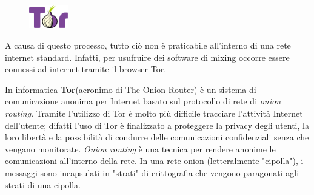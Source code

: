 \begin{figure}
	\vspace{-20pt}
	\includegraphics[width=0.15\textwidth]{figure/torlogo}
\end{figure}
A causa di questo processo, tutto ciò non è praticabile all'interno di una rete internet standard. Infatti, per usufruire dei software di mixing occorre essere connessi ad internet tramite il browser Tor.

In informatica \textbf{Tor}(acronimo di The Onion Router) è un sistema di comunicazione anonima per Internet basato sul protocollo di rete di \textit{onion routing}. Tramite l'utilizzo di Tor è molto più difficile tracciare l'attività Internet dell'utente; difatti l'uso di Tor è finalizzato a proteggere la privacy degli utenti, la loro libertà e la possibilità di condurre delle comunicazioni confidenziali senza che vengano monitorate. \textit{Onion routing} è una tecnica per rendere anonime le comunicazioni all'interno della rete. In una rete onion (letteralmente "cipolla"), i messaggi sono incapsulati in "strati" di crittografia che vengono paragonati agli strati di una cipolla. \cite{wiki:tor}

